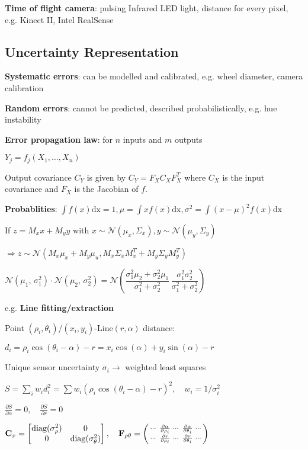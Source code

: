\documentclass[fontsize=6pt]{scrartcl}
\newcommand{\mat}[1]{\mathbf{#1}}
\begin{document}
\begin{multicols*}{4}
\begin{minipage}{0.42\linewidth}
\textbf{Time of flight camera}: pulsing Infrared LED light, distance for every pixel, e.g. Kinect II, Intel RealSense
\end{minipage}

\subsection*{Uncertainty Representation}
\textbf{Systematic errors}: can be modelled and calibrated, e.g. wheel diameter, camera calibration

\textbf{Random errors}: cannot be predicted, described probabilistically, e.g. hue instability

\textbf{Error propagation law}: for $n$ inputs and $m$ outputs

$Y_j = f_j(X_1, \ldots, X_n)$

Output covariance $C_Y$ is given by $C_Y=F_X C_X F_X^T$ where $C_X$ is the input covariance and $F_X$ is the Jacobian of $f$.

\textbf{Probablities}: $ \int f(x) \text{dx} = 1, \mu = \int x f(x) \text{dx}, \sigma^2 = \int (x-\mu)^2 f(x) \text{dx}$

If $z = M_x x + M_y y$ with $ x\sim \mathcal{N}(\mu_x, \Sigma_x), y\sim \mathcal{N}(\mu_y, \Sigma_y) $

$\Rightarrow z\sim \mathcal{N}(M_x \mu_x + M_y \mu_u, M_x \Sigma_x M_x^T + M_y \Sigma_y M_y^T)$

$
\mathcal{N}(\mu_{1},\,\sigma^{2}_{1})\cdot\mathcal{N}(\mu_{2},\,\sigma^{2}_{2})= \mathcal{N}\left(\dfrac{\sigma^{2}_{1}\mu_{2}+\sigma^{2}_{2}\mu_{1}}{\sigma^{2}_{1}+\sigma^{2}_{2}}\,\dfrac{\sigma^{2}_{1}\sigma^{2}_{2}}{\sigma^{2}_{1}+\sigma^{2}_{2}}\right)
$


e.g. \textbf{Line fitting/extraction}

Point $(\rho_i, \theta_i)$/$(x_i, y_i)$-Line$(r, \alpha)$ distance:

$d_i = \rho_i \cos(\theta_i - \alpha) -r = x_i\cos(\alpha) + y_i\sin(\alpha) - r$

Unique sensor uncertainty $\sigma_i \rightarrow$ weighted least squares

$S = \sum_i w_i d_i^2 = \sum w_i(\rho_i \cos(\theta_i - \alpha) -r )^2, \quad w_i = 1/\sigma_i^2$

$\frac{\partial S}{\partial \alpha} = 0,\quad \frac{\partial S}{\partial r} = 0$

$\mat C_x =
\begin{bmatrix}
\diag(\sigma_\rho^2) & 0\\
0 & \diag(\sigma_\theta^2)
\end{bmatrix},
\quad
\mat F_{\rho\theta} =
\left(
\begin{smallmatrix}
\cdots & \frac{\partial \alpha}{\partial \rho_i} & \cdots & \frac{\partial \alpha}{\partial \theta_i} & \cdots\\
\cdots & \frac{\partial r}{\partial \rho_i} & \cdots & \frac{\partial r}{\partial \theta_i} & \cdots
\end{smallmatrix}
\right)
$


\end{multicols*}
\end{document}
